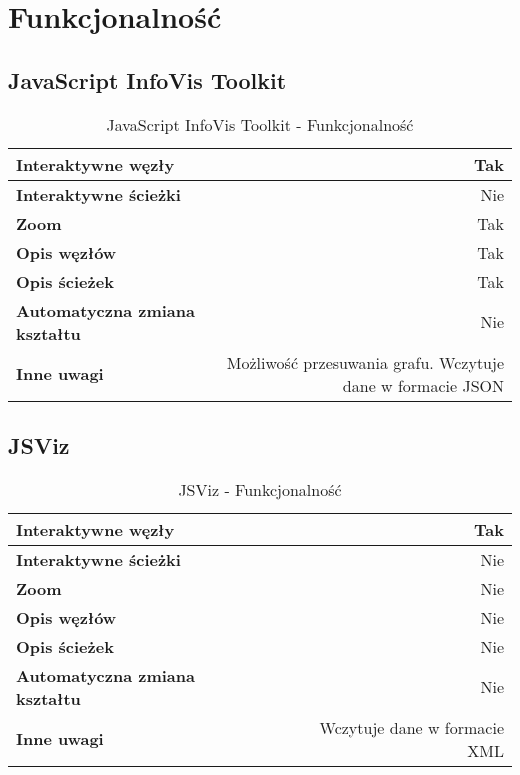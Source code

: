 \vfill
\newpage
\section{Funkcjonalność}
\subsection{JavaScript InfoVis Toolkit}

\begin{table}[H]
\begin{tabularx}{\textwidth}{ ||l|R|| }
\hline
\textbf{Interaktywne węzły} & Tak \\
\hline
\textbf{Interaktywne ścieżki} & Nie \\
\hline
\textbf{Zoom} & Tak \\
\hline
\textbf{Opis węzłów} & Tak \\
\hline
\textbf{Opis ścieżek} & Tak \\
\hline
\textbf{Automatyczna zmiana kształtu} & Nie \\
\hline
\textbf{Inne uwagi} & Możliwość przesuwania grafu. Wczytuje dane w formacie JSON \\
\hline

\end{tabularx}
\caption{JavaScript InfoVis Toolkit - Funkcjonalność}
\end{table}


\subsection{JSViz}

\begin{table}[H]
\begin{tabularx}{\textwidth}{ ||l|R|| }
\hline
\textbf{Interaktywne węzły} & Tak \\
\hline
\textbf{Interaktywne ścieżki} & Nie \\
\hline
\textbf{Zoom} & Nie \\
\hline
\textbf{Opis węzłów} & Nie \\
\hline
\textbf{Opis ścieżek} & Nie \\
\hline
\textbf{Automatyczna zmiana kształtu} & Nie \\
\hline
\textbf{Inne uwagi} & Wczytuje dane w formacie XML\\
\hline

\end{tabularx}
\caption{JSViz - Funkcjonalność}
\end{table}


